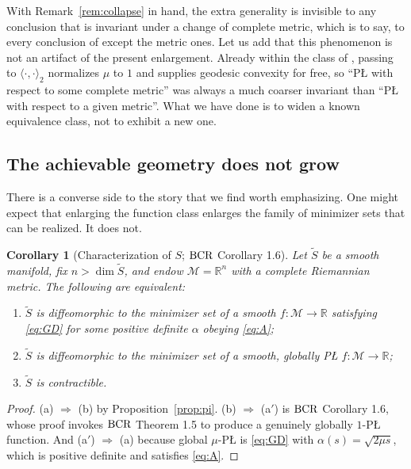 \documentclass[11pt]{article}
\theoremstyle{plain}
\newtheorem{cor}[thm]{Corollary}
\theoremstyle{definition}
\theoremstyle{remark}
\newcommand{\M}{\mathcal{M}}
\newcommand{\R}{\mathbb{R}}
\newcommand{\bcr}{\textup{BCR}}
\begin{document}
With Remark~\ref{rem:collapse} in hand, the extra generality is invisible to any
conclusion that is invariant under a change of complete metric, which is to
say, to every conclusion of \cite{BCR2026} except the metric ones. Let us add
that this phenomenon is not an artifact of the present enlargement. Already
within the class of \cite{BCR2026}, passing to $\langle\cdot,\cdot\rangle_2$
normalizes $\mu$ to $1$ and supplies geodesic convexity for free, so
``P\L{} with respect to some complete metric'' was always a much coarser
invariant than ``P\L{} with respect to a given metric''. What we have done is to
widen a known equivalence class, not to exhibit a new one.

\subsection{The achievable geometry does not grow}

There is a converse side to the story that we find worth emphasizing. One might
expect that enlarging the function class enlarges the family of minimizer sets
that can be realized. It does not.

\begin{cor}[Characterization of $S$; $\bcr$ Corollary 1.6]\label{cor:charS}
Let $\tilde S$ be a smooth manifold, fix $n > \dim\tilde S$, and endow
$\M=\R^n$ with a complete Riemannian metric. The following are equivalent:
\begin{enumerate}
\item[(a)] $\tilde S$ is diffeomorphic to the minimizer set of a smooth
$f\colon\M\to\R$ satisfying \eqref{eq:GD} for some positive definite $\alpha$
obeying \eqref{eq:A};
\item[(a$'$)] $\tilde S$ is diffeomorphic to the minimizer set of a smooth,
globally P\L{} $f\colon\M\to\R$;
\item[(b)] $\tilde S$ is contractible.
\end{enumerate}
\end{cor}

\begin{proof}
(a) $\Rightarrow$ (b) by Proposition~\ref{prop:pi}. (b) $\Rightarrow$ (a$'$) is
$\bcr$ Corollary 1.6, whose proof invokes $\bcr$ Theorem 1.5 to produce a
genuinely globally $1$-P\L{} function. And (a$'$) $\Rightarrow$ (a) because
global $\mu$-P\L{} is \eqref{eq:GD} with $\alpha(s)=\sqrt{2\mu s}$, which is
positive definite and satisfies \eqref{eq:A}.
\end{proof}
\end{document}
